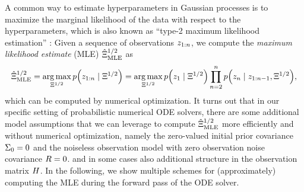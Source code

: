 \documentclass{mimosis}
\begin{document}
A common way to estimate hyperparameters in Gaussian processes is to maximize the marginal likelihood of the data with respect to the hyperparameters,
which is also known as ``type-2 maximum likelihood estimation''
\parencite{rasmussen2005gpml}:
Given a sequence of observations \(z_{1:n}\), we compute the \emph{maximum likelihood estimate} (MLE) \(\hat{\Xi}^{1/2}_\text{MLE}\) as
\begin{equation}
  \label{eq:calibration:mle}
  \DiffMLE = \argmax_{\Diff} \p( \obs_{1:n} \mid \Diff ) = \argmax_{\Diff} \p(\obs_1 \mid \Diff) \prod_{\idxt=2}^n \p(\obs_\idxt \mid \obs_{1:\idxt-1}, \Diff),
\end{equation}
which can be computed by numerical optimization.
It turns out that in our specific setting of probabilistic numerical ODE solvers, there are some additional model assumptions that we can leverage to compute \(\hat{\Xi}^{1/2}_\text{MLE}\) more efficiently and without numerical optimization,
namely the zero-valued initial prior covariance \(\Sigma_{0} = 0\) and the noiseless observation model with zero observation noise covariance \(R = 0\).
and in some cases also additional structure in the observation matrix \(H\).
In the following, we show multiple schemes for (approximately) computing the MLE during the forward pass of the ODE solver.
\end{document}
